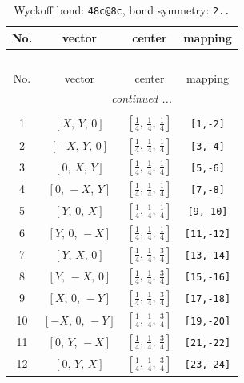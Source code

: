 \documentclass[fleqn,8pt]{jsarticle}
\begin{document}
\begin{longtable}{cccc}
\caption{Wyckoff bond: {\tt 48c@8c}, bond symmetry: {\tt 2..}}
 \\
 \hline \hline
No. & vector & center & mapping \\ \hline \endfirsthead

\multicolumn{3}{l}{\tablename\ \thetable{}} \\
 \hline \hline
No. & vector & center & mapping \\ \hline \endhead

 \hline \hline
\multicolumn{3}{r}{\footnotesize\it continued ...} \\ \endfoot

 \hline \hline
\multicolumn{3}{r}{} \\ \endlastfoot

1 & $\left[ X,\, Y,\, 0 \right]$ & $\left[ \frac{1}{4},\, \frac{1}{4},\, \frac{1}{4} \right]$ & {\tt [1,-2]} \\ \hline
2 & $\left[ - X,\, Y,\, 0 \right]$ & $\left[ \frac{1}{4},\, \frac{1}{4},\, \frac{1}{4} \right]$ & {\tt [3,-4]} \\ \hline
3 & $\left[ 0,\, X,\, Y \right]$ & $\left[ \frac{1}{4},\, \frac{1}{4},\, \frac{1}{4} \right]$ & {\tt [5,-6]} \\ \hline
4 & $\left[ 0,\, - X,\, Y \right]$ & $\left[ \frac{1}{4},\, \frac{1}{4},\, \frac{1}{4} \right]$ & {\tt [7,-8]} \\ \hline
5 & $\left[ Y,\, 0,\, X \right]$ & $\left[ \frac{1}{4},\, \frac{1}{4},\, \frac{1}{4} \right]$ & {\tt [9,-10]} \\ \hline
6 & $\left[ Y,\, 0,\, - X \right]$ & $\left[ \frac{1}{4},\, \frac{1}{4},\, \frac{1}{4} \right]$ & {\tt [11,-12]} \\ \hline
7 & $\left[ Y,\, X,\, 0 \right]$ & $\left[ \frac{1}{4},\, \frac{1}{4},\, \frac{3}{4} \right]$ & {\tt [13,-14]} \\ \hline
8 & $\left[ Y,\, - X,\, 0 \right]$ & $\left[ \frac{1}{4},\, \frac{1}{4},\, \frac{3}{4} \right]$ & {\tt [15,-16]} \\ \hline
9 & $\left[ X,\, 0,\, - Y \right]$ & $\left[ \frac{1}{4},\, \frac{1}{4},\, \frac{3}{4} \right]$ & {\tt [17,-18]} \\ \hline
10 & $\left[ - X,\, 0,\, - Y \right]$ & $\left[ \frac{1}{4},\, \frac{1}{4},\, \frac{3}{4} \right]$ & {\tt [19,-20]} \\ \hline
11 & $\left[ 0,\, Y,\, - X \right]$ & $\left[ \frac{1}{4},\, \frac{1}{4},\, \frac{3}{4} \right]$ & {\tt [21,-22]} \\ \hline
12 & $\left[ 0,\, Y,\, X \right]$ & $\left[ \frac{1}{4},\, \frac{1}{4},\, \frac{3}{4} \right]$ & {\tt [23,-24]} \\
\end{longtable}
\end{document}

